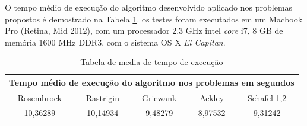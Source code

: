 O tempo médio de execução do algoritmo desenvolvido aplicado nos problemas propostos é demostrado na Tabela \ref{tb:time}. os testes foram executados em um Macbook Pro (Retina, Mid 2012), com um processador 2.3 GHz intel \textit{core} i7, 8 GB de memória 1600 MHz DDR3, com o sistema OS X \textit{El Capitan}.

\begin{table}[]
\centering
\caption{Tabela de media de tempo de execução}\label{tb:time}
\begin{tabular}{|c|c|c|c|c|}
\hline
\multicolumn{5}{|c|}{Tempo médio de execução do algoritmo nos problemas em segundos} \\ \hline
Rosembrock       & Rastrigin       & Griewank      & Ackley       & Schafel 1,2      \\ \hline
10,36289         & 10,14934        & 9,48279       & 8,97532      & 9,31242          \\ \hline
\end{tabular}
\end{table}
